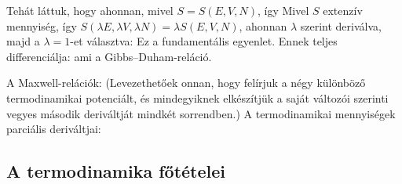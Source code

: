   Tehát láttuk, hogy
   ahonnan, mivel $S=S(E,V,N)$,
   így
   Mivel $S$ extenzív mennyiség, így $S(\lambda E,\lambda V,\lambda N)=\lambda S(E,V,N)$, ahonnan $\lambda$ szerint deriválva, majd a $\lambda=1$-et választva:
   Ez a fundamentális egyenlet. Ennek teljes differenciálja: 
   ami a Gibbs--Duham-reláció. 
   
   A Maxwell-relációk: (Levezethetőek onnan, hogy felírjuk a négy különböző termodinamikai potenciált, és mindegyiknek elkészítjük a saját változói szerinti vegyes második deriváltját mindkét sorrendben.)
   A termodinamikai mennyiségek parciális deriváltjai:
   
  \subsection{A termodinamika főtételei}
   
